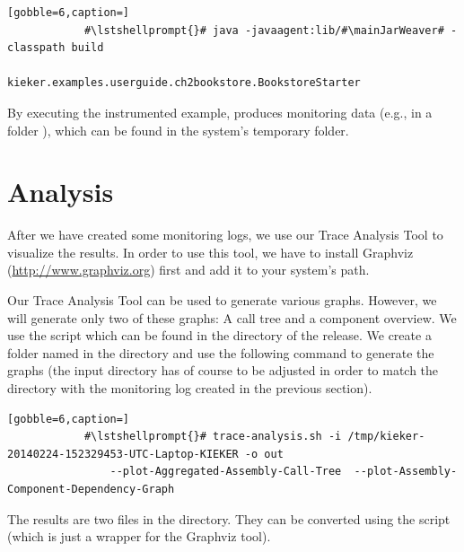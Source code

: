 		\setBashListing
		\begin{lstlisting}[gobble=6,caption=]			
			#\lstshellprompt{}# java -javaagent:lib/#\mainJarWeaver# -classpath build
			    kieker.examples.userguide.ch2bookstore.BookstoreStarter
		\end{lstlisting} 
		
		\noindent
		By executing the instrumented example, \Kieker{} produces monitoring data (e.g., in a folder ), which can be found in the system's temporary folder.
	
	\section{Analysis}
	
		After we have created some monitoring logs, we use our Trace Analysis Tool to visualize the results. In order to use this tool, we have to install Graphviz (\url{http://www.graphviz.org}) first and add it to your system's path. \\

		
		\noindent
		Our Trace Analysis Tool can be used to generate various graphs. However, we will generate only two of these graphs: A call tree and a component overview. We use the script  which can be found in the  directory of the release. We create a folder named  in the  directory and use the following command to generate the graphs (the input directory has of course to be adjusted in order to match the directory with the monitoring log created in the previous section).
		
		\setBashListing
		\begin{lstlisting}[gobble=6,caption=]			
			#\lstshellprompt{}# trace-analysis.sh -i /tmp/kieker-20140224-152329453-UTC-Laptop-KIEKER -o out 
			    --plot-Aggregated-Assembly-Call-Tree  --plot-Assembly-Component-Dependency-Graph
		\end{lstlisting} 
		
		\noindent
		The results are two  files in the  directory. They can be converted using the script  (which is just a wrapper for the Graphviz tool).
		
